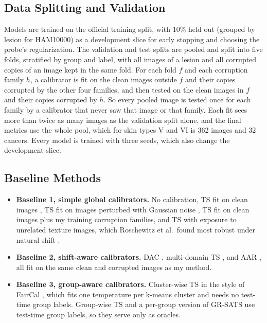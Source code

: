 \documentclass[sigconf,nonacm]{acmart}
\begin{document}
\subsection{Data Splitting and Validation}
\label{sec:splits}

Models are trained on the official training split, with 10\% held out (grouped by lesion for HAM10000) as a development slice for early stopping and choosing the probe's regularization. The validation and test splits are pooled and split into five folds, stratified by group and label, with all images of a lesion and all corrupted copies of an image kept in the same fold. For each fold $f$ and each corruption family $h$, a calibrator is fit on the clean images outside $f$ and their copies corrupted by the other four families, and then tested on the clean images in $f$ and their copies corrupted by $h$. So every pooled image is tested once for each family by a calibrator that never saw that image or that family. Each fit sees more than twice as many images as the validation split alone, and the final metrics use the whole pool, which for skin types V and VI is 362 images and 32 cancers. Every model is trained with three seeds, which also change the development slice.

\subsection{Baseline Methods}
\label{sec:baselines}

\begin{itemize}
  \item \textbf{Baseline 1, simple global calibrators.} No calibration, TS fit on clean images \cite{guo2017calibration}, TS fit on images perturbed with Gaussian noise \cite{tomani2021posthoc}, TS fit on clean images plus my training corruption families, and TS with exposure to unrelated texture images, which Roschewitz et al.\ found most robust under natural shift \cite{roschewitz2025where}.
  \item \textbf{Baseline 2, shift-aware calibrators.} DAC \cite{tomani2023dac}, multi-domain TS \cite{yu2022multidomain}, and AAR \cite{yuksekgonul2023atypicality}, all fit on the same clean and corrupted images as my method.
  \item \textbf{Baseline 3, group-aware calibrators.} Cluster-wise TS in the style of FairCal \cite{salvador2022faircal}, which fits one temperature per k-means cluster and needs no test-time group labels. Group-wise TS and a per-group version of GR-SATS use test-time group labels, so they serve only as oracles.
\end{itemize}
\end{document}
